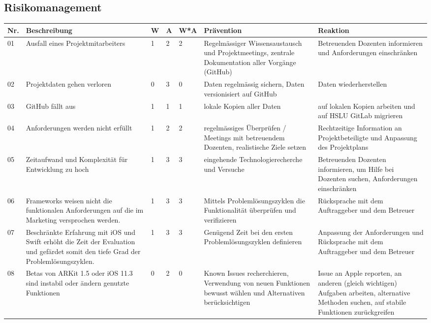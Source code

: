 \subsection{Risikomanagement}

\begin{longtable}{lp{3.5cm}lllp{3.5cm}p{3.5cm}}
	\hline
	\textbf{Nr.} & \textbf{Beschreibung} & \textbf{W} & \textbf{A} & \textbf{W*A} & \textbf{Prävention} & \textbf{Reaktion} \\ 
	\hline
	01  & Ausfall eines Projektmitarbeiters & 1 & 2 & 2 & Regelmässiger Wissensaustausch und Projektmeetings, zentrale Dokumentation aller Vorgänge (GitHub) & Betreuenden Dozenten informieren und Anforderungen einschränken \\
	\hline
	02  & Projektdaten gehen verloren & 0 & 3 & 0 & Daten regelmässig sichern, Daten versionisiert auf GitHub & Daten wiederherstellen \\
	\hline
	03  & GitHub fällt aus & 1 & 1 & 1 & lokale Kopien aller Daten & auf lokalen Kopien arbeiten und auf HSLU GitLab migrieren \\
	\hline
	04  & Anforderungen werden nicht erfüllt & 1 & 2 & 2 & regelmässiges Überprüfen / Meetings mit betreuendem Dozenten, realistische Ziele setzen & Rechtzeitige Information an Projektbeteiligte und Anpassung des Projektplans \\
	\hline
	05  & Zeitaufwand und Komplexität für Entwicklung zu hoch & 1 & 3 & 3 & eingehende Technologierecherche und Versuche & Betreuenden Dozenten informieren, um Hilfe bei Dozenten suchen, Anforderungen einschränken \\
	\hline
	06  & Frameworks weisen nicht die funktionalen Anforderungen auf die im Marketing versprochen werden. & 1 & 3 & 3 & Mittels Problemlösungszyklen die Funktionalität überprüfen und verifizieren & Rücksprache mit dem Auftraggeber und dem Betreuer \\
	\hline
	07  & Beschränkte Erfahrung mit iOS und Swift erhöht die Zeit der Evaluation und gefärdet somit den tiefe Grad der Problemlösungszyklen. & 1 & 3 & 3 & Genügend Zeit bei den ersten Problemlösungszyklen definieren & Anpassung der Anforderungen und Rücksprache mit dem Auftraggeber und dem Betreuer \\
	\hline
	08  & Betas von ARKit 1.5 oder iOS 11.3 sind instabil oder ändern genutzte Funktionen & 0 & 2 & 0 & Known Issues recherchieren, Verwendung von neuen Funktionen bewusst wählen und Alternativen berücksichtigen & Issue an Apple reporten, an anderen (gleich wichtigen) Aufgaben arbeiten, alternative Methoden suchen, auf stabile Funktionen zurückgreifen \\

\end{longtable}
